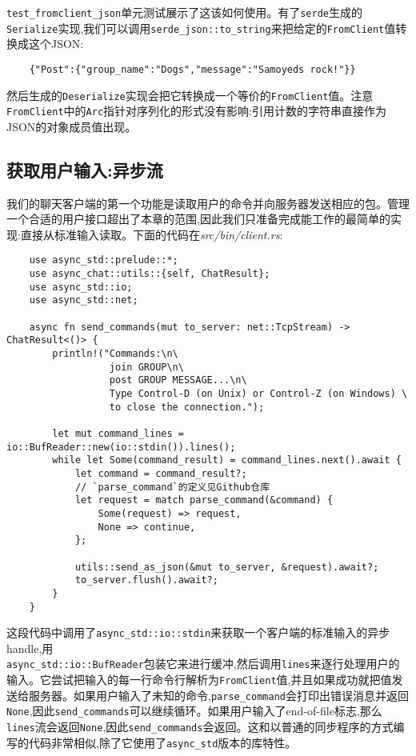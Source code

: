 \texttt{test\_fromclient\_json}单元测试展示了这该如何使用。有了\texttt{serde}生成的\texttt{Serialize}实现,我们可以调用\texttt{serde\_json::to\_string}来把给定的\texttt{FromClient}值转换成这个JSON:
\begin{verbatim}
    {"Post":{"group_name":"Dogs","message":"Samoyeds rock!"}}
\end{verbatim}

然后生成的\texttt{Deserialize}实现会把它转换成一个等价的\texttt{FromClient}值。注意\texttt{FromClient}中的\texttt{Arc}指针对序列化的形式没有影响:引用计数的字符串直接作为JSON的对象成员值出现。

\subsection{获取用户输入:异步流}
我们的聊天客户端的第一个功能是读取用户的命令并向服务器发送相应的包。管理一个合适的用户接口超出了本章的范围,因此我们只准备完成能工作的最简单的实现:直接从标准输入读取。下面的代码在\emph{src/bin/client.rs}:
\begin{verbatim}
    use async_std::prelude::*;
    use async_chat::utils::{self, ChatResult};
    use async_std::io;
    use async_std::net;

    async fn send_commands(mut to_server: net::TcpStream) -> ChatResult<()> {
        println!("Commands:\n\
                  join GROUP\n\
                  post GROUP MESSAGE...\n\
                  Type Control-D (on Unix) or Control-Z (on Windows) \
                  to close the connection.");

        let mut command_lines = io::BufReader::new(io::stdin()).lines();
        while let Some(command_result) = command_lines.next().await {
            let command = command_result?;
            // `parse_command`的定义见Github仓库
            let request = match parse_command(&command) {
                Some(request) => request,
                None => continue,
            };

            utils::send_as_json(&mut to_server, &request).await?;
            to_server.flush().await?;
        }
    }
\end{verbatim}

这段代码中调用了\texttt{async\_std::io::stdin}来获取一个客户端的标准输入的异步handle,用\\
\texttt{async\_std::io::BufReader}包装它来进行缓冲,然后调用\texttt{lines}来逐行处理用户的输入。它尝试把输入的每一行命令行解析为\texttt{FromClient}值,并且如果成功就把值发送给服务器。如果用户输入了未知的命令,\texttt{parse\_command}会打印出错误消息并返回\texttt{None},因此\texttt{send\_commands}可以继续循环。如果用户输入了end-of-file标志,那么\texttt{lines}流会返回\texttt{None},因此\texttt{send\_commands}会返回。这和以普通的同步程序的方式编写的代码非常相似,除了它使用了\texttt{async\_std}版本的库特性。

